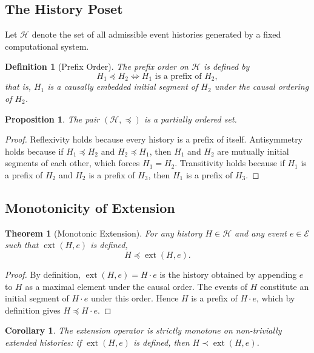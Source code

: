 \documentclass[12pt]{article}
\newtheorem{definition}{Definition}
\newtheorem{proposition}{Proposition}
\newtheorem{theorem}{Theorem}
\newtheorem{corollary}{Corollary}
\begin{document}
\subsection{The History Poset}

Let $\mathcal{H}$ denote the set of all admissible event histories generated by a fixed computational system.

\begin{definition}[Prefix Order]
The \emph{prefix order} on $\mathcal{H}$ is defined by
\[
H_1 \preceq H_2 \iff H_1 \text{ is a prefix of } H_2,
\]
that is, $H_1$ is a causally embedded initial segment of $H_2$ under the causal ordering of $H_2$.
\end{definition}

\begin{proposition}
The pair $(\mathcal{H}, \preceq)$ is a partially ordered set.
\end{proposition}

\begin{proof}
Reflexivity holds because every history is a prefix of itself. Antisymmetry holds because if $H_1 \preceq H_2$ and $H_2 \preceq H_1$, then $H_1$ and $H_2$ are mutually initial segments of each other, which forces $H_1 = H_2$. Transitivity holds because if $H_1$ is a prefix of $H_2$ and $H_2$ is a prefix of $H_3$, then $H_1$ is a prefix of $H_3$.
\end{proof}

\subsection{Monotonicity of Extension}

\begin{theorem}[Monotonic Extension]
\label{thm:monotone}
For any history $H \in \mathcal{H}$ and any event $e \in \mathcal{E}$ such that $\operatorname{ext}(H, e)$ is defined,
\[
H \preceq \operatorname{ext}(H, e).
\]
\end{theorem}

\begin{proof}
By definition, $\operatorname{ext}(H, e) = H \cdot e$ is the history obtained by appending $e$ to $H$ as a maximal element under the causal order. The events of $H$ constitute an initial segment of $H \cdot e$ under this order. Hence $H$ is a prefix of $H \cdot e$, which by definition gives $H \preceq H \cdot e$.
\end{proof}

\begin{corollary}
The extension operator is strictly monotone on non-trivially extended histories: if $\operatorname{ext}(H, e)$ is defined, then $H \prec \operatorname{ext}(H, e)$.
\end{corollary}
\end{document}
